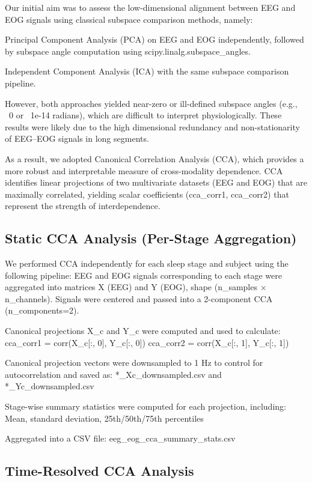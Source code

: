 Our initial aim was to assess the low-dimensional alignment between EEG and EOG signals using classical subspace comparison methods, namely:

Principal Component Analysis (PCA) on EEG and EOG independently, followed by subspace angle computation using scipy.linalg.subspace_angles.

Independent Component Analysis (ICA) with the same subspace comparison pipeline.

However, both approaches yielded near-zero or ill-defined subspace angles (e.g., ~0 or ~1e-14 radians), which are difficult to interpret physiologically. These results were likely due to the high dimensional redundancy and non-stationarity of EEG–EOG signals in long segments.

As a result, we adopted Canonical Correlation Analysis (CCA), which provides a more robust and interpretable measure of cross-modality dependence. CCA identifies linear projections of two multivariate datasets (EEG and EOG) that are maximally correlated, yielding scalar coefficients (cca_corr1, cca_corr2) that represent the strength of interdependence.

\subsection{Static CCA Analysis (Per-Stage Aggregation)}

We performed CCA independently for each sleep stage and subject using the following pipeline:
EEG and EOG signals corresponding to each stage were aggregated into matrices X (EEG) and Y (EOG), shape (n_samples × n_channels).
Signals were centered and passed into a 2-component CCA (n_components=2).

Canonical projections X_c and Y_c were computed and used to calculate:
cca_corr1 = corr(X_c[:, 0], Y_c[:, 0])
cca_corr2 = corr(X_c[:, 1], Y_c[:, 1])

Canonical projection vectors were downsampled to 1 Hz to control for autocorrelation and saved as:
*_Xc_downsampled.csv and *_Yc_downsampled.csv

Stage-wise summary statistics were computed for each projection, including:
Mean, standard deviation, 25th/50th/75th percentiles

Aggregated into a CSV file: eeg_eog_cca_summary_stats.csv

\subsection{Time-Resolved CCA Analysis}

